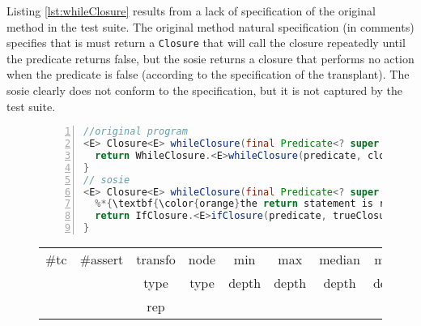 Listing \ref{lst:whileClosure} results from a lack of specification of the original method in the test suite. 
The original method natural specification (in comments) specifies that is must return a \texttt{Closure} that will call the closure repeatedly until the predicate returns false, but the sosie returns a closure that performs no action when the predicate is false (according to the specification of the transplant). 
The sosie clearly does not conform to the specification, but it is not captured by the test suite.

\begin{figure}[ht]
\begin{lstlisting}[caption={\texttt{whileClosure} in commons.collection},label={lst:whileClosure},language=java,numbers=left]
//original program
<E> Closure<E> whileClosure(final Predicate<? super E> predicate, final Closure<? super E> closure) {
  return WhileClosure.<E>whileClosure(predicate, closure, false);
}
// sosie  
<E> Closure<E> whileClosure(final Predicate<? super E> predicate, final Closure<? super E> closure) {
  %*{\textbf{\color{orange}the return statement is replaced by the following}}*)
  return IfClosure.<E>ifClosure(predicate, trueClosure, NOPClosure.<E>nopClosure());
}
\end{lstlisting}
\tabcolsep=0.11cm
\begin{tabular}{>{\small}c>{\small}c>{\small}c>{\small}c>{\small}c>{\small}c>{\small}c>{\small}c}
\hline
\rowcolor{lightgray} \#tc & \#assert & transfo & node & min & max & median & mean   \\
\rowcolor{lightgray}  & & type & type & depth  & depth & depth & depth  \\ 
\hline
 &  & rep &  &  &  &  & \\
\hline
\end{tabular}
\end{figure}
